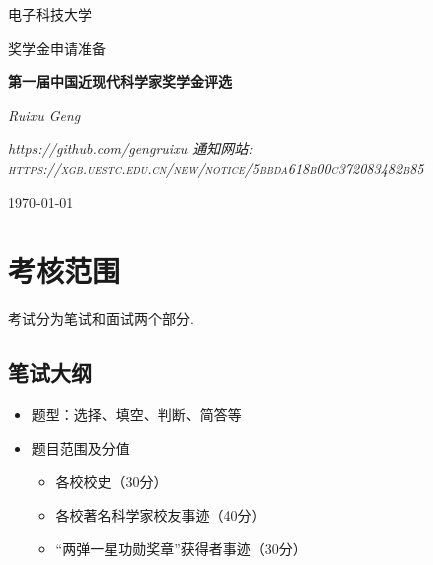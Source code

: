 \documentclass[UTF8]{ctexart}
\begin{document}
     
%    
     
    
    \newpage
	{
    \centering
	{\scshape\LARGE 电子科技大学 \par}
	\vspace{1cm}
	{\huge\scshape\Large 奖学金申请准备 \par}
	\vspace{1.5cm}
	{\huge\bfseries 第一届中国近现代科学家奖学金评选\par}
	\vspace{2cm}
	{\Large\itshape Ruixu Geng\par}
	\Large\itshape	https://github.com/gengruixu
	\vfill
    通知网站: \textsc{\small https://xgb.uestc.edu.cn/new/notice/5bbda618b00c372083482b85}
	\vfill
	{\large \today\par}
    }


    \newpage
    \setcounter{secnumdepth}{7}
    \setcounter{tocdepth}{7}
    \tableofcontents
    \newpage
    \section{考核范围}
    考试分为笔试和面试两个部分.
    \subsection{笔试大纲}
    \begin{itemize}
        \item 题型：选择、填空、判断、简答等
        \item 题目范围及分值
        \begin{itemize}
            \item 各校校史（30分）
            \item 各校著名科学家校友事迹（40分）
            \item “两弹一星功勋奖章”获得者事迹（30分）
        \end{itemize}
    \end{itemize}
\end{document}
